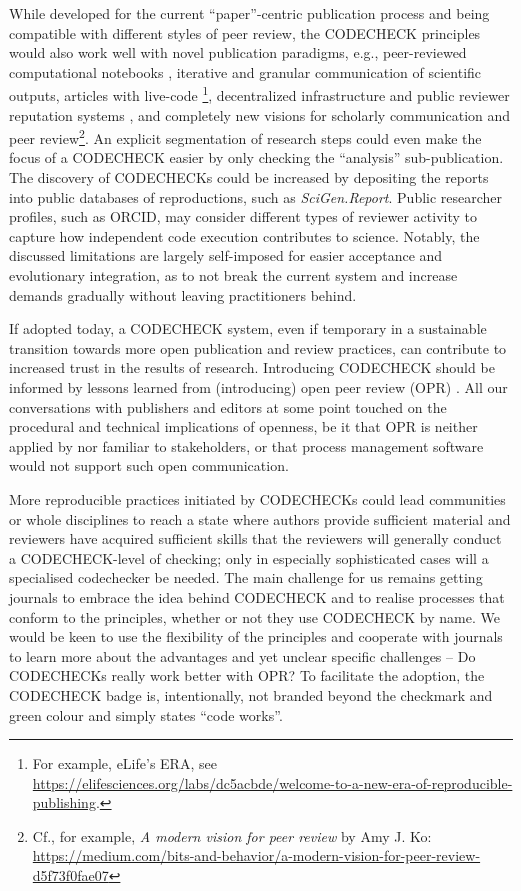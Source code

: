 \documentclass[12pt]{article}
\begin{document}
While developed for the current ``paper''-centric publication process and
being compatible with different styles of peer review, the CODECHECK 
principles would also work well with novel publication paradigms, e.g.,
peer-reviewed computational notebooks \cite{earthcube_new_2020},
iterative and granular communication of scientific outputs, 
articles with live-code \cite{perkel_pioneering_2019-1}
\footnote{For example, eLife's ERA, see 
\url{https://elifesciences.org/labs/dc5acbde/welcome-to-a-new-era-of-reproducible-publishing}.},
decentralized infrastructure and public reviewer reputation systems
\cite{tenorio-fornes_towards_2019},
and completely new visions for scholarly communication and peer 
review\footnote{Cf., for example, \emph{A modern vision for peer review} by 
Amy J. Ko: \url{https://medium.com/bits-and-behavior/a-modern-vision-for-peer-review-d5f73f0fae07}}.
An explicit segmentation of research steps could even make the focus 
of a CODECHECK easier by only checking the ``analysis'' sub-publication.
The discovery of CODECHECKs could be increased by depositing the reports
into public databases of reproductions, such as \emph{SciGen.Report}.
Public researcher profiles, such as ORCID, may consider different
types of reviewer activity to capture how independent code execution contributes to science.
Notably, the discussed limitations are largely self-imposed for easier
acceptance and evolutionary integration, as to not break the current 
system and increase demands gradually without leaving practitioners behind. 

If adopted today, a CODECHECK system, even if temporary in a sustainable 
transition towards more open publication and review practices, can contribute
to increased trust in the results of research. Introducing CODECHECK
should be informed by lessons learned from (introducing) open peer review
(OPR) \cite{ross-hellauer_guidelines_2019}.
All our conversations with publishers and editors at some point
touched on the procedural and technical implications of openness, be it 
that OPR is neither applied by nor familiar to stakeholders, or that process
management software would not support such open communication.

More reproducible practices initiated by CODECHECKs could lead
communities or whole disciplines to reach a state where authors provide 
sufficient material and reviewers have acquired sufficient skills that
the reviewers will generally conduct a CODECHECK-level of checking;
only in especially sophisticated cases will a specialised codechecker
be needed.
The main challenge for us remains getting journals to embrace the
idea behind CODECHECK and to realise processes that conform to the principles,
whether or not they use CODECHECK by name.
We would be keen to use the flexibility of the principles and cooperate
with journals to learn more about the advantages and yet unclear
specific challenges -- Do CODECHECKs really work better with OPR?
To facilitate the adoption, the CODECHECK badge is, intentionally, not branded beyond the checkmark
and green colour and simply states ``code works''.
\end{document}
